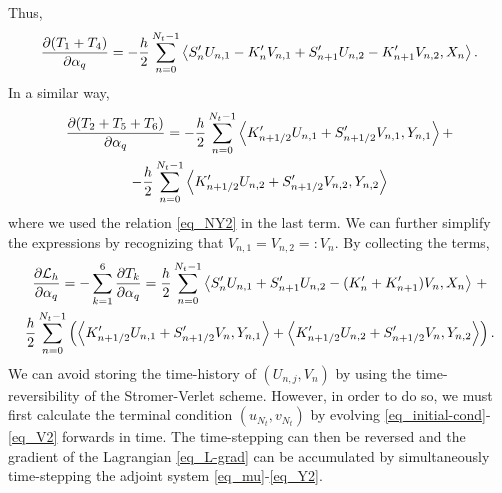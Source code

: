 \documentclass[11pt]{article}
\begin{document}
Thus,
\begin{equation}
  \frac{\partial (T_1 + T_4)}{\partial \alpha_q} = - \frac{h}{2} \sum_{n=0}^{N_t-1} \left\langle S'_nU_{n,1} - K'_nV_{n,1} + S'_{n+1}U_{n,2} -
  K'_{n+1}V_{n,2}, X_{n} \right\rangle.
\end{equation}
In a similar way,
\begin{multline}
  \frac{\partial (T_2 + T_5 + T_6)}{\partial \alpha_q} = - \frac{h}{2} \sum_{n=0}^{N_t-1} \left\langle
  K'_{n+1/2} U_{n,1} + S'_{n+1/2} V_{n,1}, Y_{n,1}\right\rangle + \\ 
  - \frac{h}{2} \sum_{n=0}^{N_t-1} \left\langle K'_{n+1/2} U_{n,2} + S'_{n+1/2} V_{n,2},Y_{n,2} \right\rangle
\end{multline}
where we used the relation \eqref{eq_NY2} in the last term. We can further simplify the expressions
by recognizing that $V_{n,1}=V_{n,2} =: V_n$. By collecting the terms,
\begin{multline}\label{eq_L-grad}
  \frac{\p{\cal L}_h}{\p \alpha_q} = - \sum_{k=1}^6 \frac{\p T_k}{\p \alpha_q} = 
%
  \frac{h}{2} \sum_{n=0}^{N_t-1} \left\langle S'_nU_{n,1} + S'_{n+1}U_{n,2} - (K'_n + K'_{n+1}) V_{n}, X_{n}
  \right\rangle\, + \\
  \frac{h}{2} \sum_{n=0}^{N_t-1} \left( \left\langle K'_{n+1/2} U_{n,1} + S'_{n+1/2} V_{n},
  Y_{n,1}\right\rangle +  \left\langle K'_{n+1/2} U_{n,2} + S'_{n+1/2} V_{n},Y_{n,2} \right\rangle \right).
\end{multline}
We can avoid storing the time-history of $(U_{n,j}, V_n)$ by using the time-reversibility of the
Stromer-Verlet scheme. However, in order to do so, we must first calculate the terminal condition
$(u_{N_t},v_{N_t})$ by evolving \eqref{eq_initial-cond}-\eqref{eq_V2} forwards in time. The
time-stepping can then be reversed and the gradient of the Lagrangian \eqref{eq_L-grad} can be
accumulated by simultaneously time-stepping the adjoint system \eqref{eq_mu}-\eqref{eq_Y2}.



\end{document}
